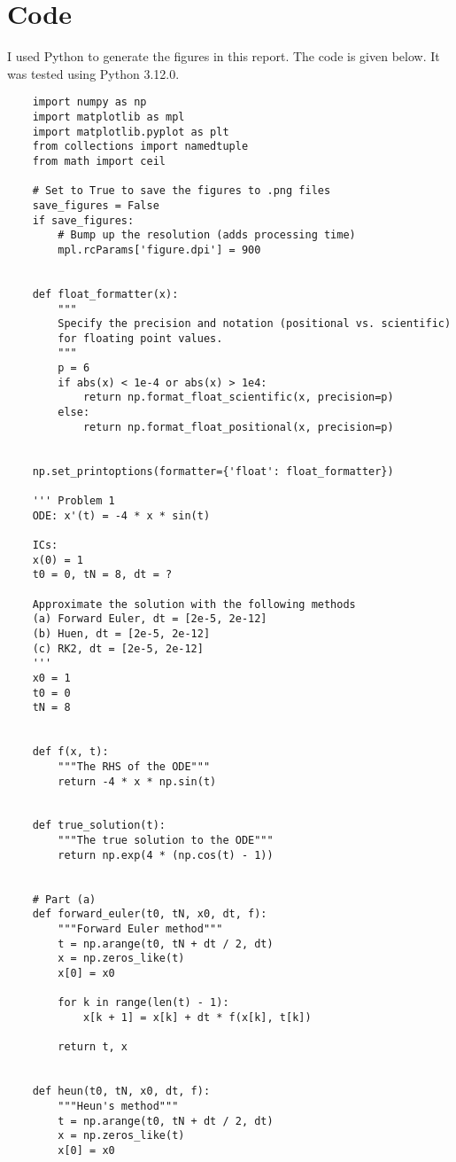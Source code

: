 \documentclass{article}
\begin{document}
\section{Code}
I used Python to generate the figures in this report.  The code is given below.  It was tested using Python 3.12.0.
\begin{verbatim}
    import numpy as np
    import matplotlib as mpl
    import matplotlib.pyplot as plt
    from collections import namedtuple
    from math import ceil
    
    # Set to True to save the figures to .png files
    save_figures = False
    if save_figures:
        # Bump up the resolution (adds processing time)
        mpl.rcParams['figure.dpi'] = 900
    
    
    def float_formatter(x):
        """
        Specify the precision and notation (positional vs. scientific)
        for floating point values.
        """
        p = 6
        if abs(x) < 1e-4 or abs(x) > 1e4:
            return np.format_float_scientific(x, precision=p)
        else:
            return np.format_float_positional(x, precision=p)
    
    
    np.set_printoptions(formatter={'float': float_formatter})
    
    ''' Problem 1
    ODE: x'(t) = -4 * x * sin(t)
    
    ICs:
    x(0) = 1
    t0 = 0, tN = 8, dt = ?
    
    Approximate the solution with the following methods
    (a) Forward Euler, dt = [2e-5, 2e-12]
    (b) Huen, dt = [2e-5, 2e-12]
    (c) RK2, dt = [2e-5, 2e-12]
    '''
    x0 = 1
    t0 = 0
    tN = 8
    
    
    def f(x, t):
        """The RHS of the ODE"""
        return -4 * x * np.sin(t)
    
    
    def true_solution(t):
        """The true solution to the ODE"""
        return np.exp(4 * (np.cos(t) - 1))
    
    
    # Part (a)
    def forward_euler(t0, tN, x0, dt, f):
        """Forward Euler method"""
        t = np.arange(t0, tN + dt / 2, dt)
        x = np.zeros_like(t)
        x[0] = x0
    
        for k in range(len(t) - 1):
            x[k + 1] = x[k] + dt * f(x[k], t[k])
    
        return t, x
    
    
    def heun(t0, tN, x0, dt, f):
        """Heun's method"""
        t = np.arange(t0, tN + dt / 2, dt)
        x = np.zeros_like(t)
        x[0] = x0
    

\end{verbatim}
\end{document}
